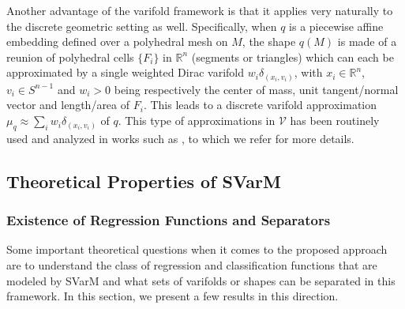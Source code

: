 \documentclass[11pt]{article}
\newcommand{\R}{\mathbb{R}}
\newcommand{\vol}{\operatorname{vol}}
\begin{document}
Another advantage of the varifold framework is that it applies very naturally to the discrete geometric setting as well. Specifically, when $q$ is a piecewise affine embedding defined over a polyhedral mesh on $M$, the shape $q(M)$ is made of a reunion of polyhedral cells $\{F_i\}$ in $\R^n$ (segments or triangles) which can each be approximated by a single weighted Dirac varifold $w_i\delta_{(x_i,v_i)}$, with $x_i \in \R^n$, $v_i \in S^{n-1}$ and $w_i>0$ being respectively the center of mass, unit tangent/normal vector and length/area of $F_i$. This leads to a discrete varifold approximation $\mu_q \approx \sum_{i} w_i \delta_{(x_i,v_i)}$ of $q$. This type of approximations in $\mathcal{V}$ has been routinely used and analyzed in works such as \cite{kaltenmark2017general,buet2022weak,paul2024sparse}, to which we refer for more details.


\subsection{Theoretical Properties of SVarM}
\label{sec:theo_res}
\subsubsection{Existence of Regression Functions and Separators}
Some important theoretical questions when it comes to the proposed approach are to understand the class of regression and classification functions that are modeled by SVarM and what sets of varifolds or shapes can be separated in this framework. In this section, we present a few results in this direction.
\end{document}
